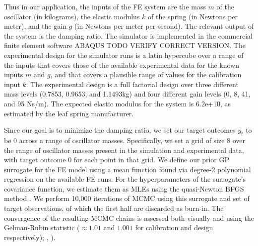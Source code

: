 \documentclass[12pt]{article}
\begin{document}
%
Thus in our application, the inputs of the FE system are the mass $m$ of the oscillator (in kilograms), the elastic modulus $k$ of the spring (in Newtons per meter), and the gain $g$ (in Newtons per meter per second).
%
The relevant output of the system is the damping ratio.
%
The simulator is implemented in the commercial finite element software ABAQUS \citep{Abaqus2012} TODO VERIFY CORRECT VERSION.
%
The experimental design for the simulator runs is a latin hypercube over a range of the inputs that covers those of the available experimental data for the known inputs $m$ and $g$, and that covers a plausible range of values for the calibration input $k$.
%
The experimental design is a full factorial design over three different mass levels (0.7853, 0.9653, and 1.1493kg) and four different gain levels (0, 8, 41, and 95 Ns/m).
%
The expected elastic modulus for the system is 6.2e+10, as estimated by the leaf spring manufacturer.
%

%
Since our goal is to minimize the damping ratio, we set our target outcomes $y_t$ to be 0 across a range of oscillator masses.
%
Specifically, we set a grid of size 8 over the range of oscillator masses present in the simulation and experimental data, with target outcome 0 for each point in that grid.
%
We define our prior GP surrogate for the FE model using a mean function found via degree-2 polynomial regression on the available FE runs.
%
For the hyperparameters of the surrogate's covariance function, we estimate them as MLEs using the quasi-Newton BFGS method \citep{Fletcher2013}.
%
We perform 10,000 iterations of MCMC using this surrogate and set of target observations, of which the first half are discarded as burn-in.
%
The convergence of the resulting MCMC chains is assessed both visually and using the Gelman-Rubin statistic ($\approx1.01$ and $1.001$ for calibration and design respectively); \citeauthor{Gelman1992a}, \citeyear{Gelman1992a}).
%
\end{document}
